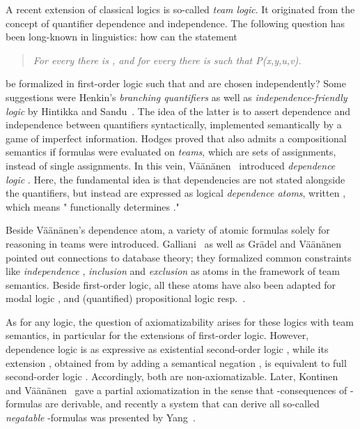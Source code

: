 \documentclass[a4paper,english,fleqn,11pt,final]{scrartcl}
\theoremstyle{plain}
\theoremstyle{definition}
\begin{document}
A recent extension of classical logics is so-called \emph{team logic}.
It originated from the concept of quantifier dependence and independence. The following question has been long-known in linguistics: how can the statement
\begin{quote}
\emph{For every  there is , and for every  there is  such that P(x,y,u,v).}
\end{quote} be formalized in first-order logic such that  and  are chosen independently?
Some suggestions were Henkin's \emph{branching quantifiers} \cite{Henkin1961} as well as \emph{in\-de\-pend\-ence-friendly logic}  by Hintikka and Sandu~\cite{hintikka_informational_1989}.
The idea of the latter is to assert dependence and independence between quantifiers syntactically, implemented semantically by a game of imperfect information.
Hodges \cite{Hodges1997} proved that  also admits a compositional semantics if formulas were evaluated on \emph{teams}, which are sets of assignments, instead of single assignments.
In this vein, Väänänen~\cite{vaananen_dependence_2007} introduced \emph{dependence logic} .
Here, the fundamental idea is that dependencies are not stated alongside the quantifiers, but instead are expressed as logical \emph{dependence atoms}, written , which means " functionally determines ."

\smallskip

Beside Väänänen's dependence atom, a variety of atomic formulas solely for reasoning in teams were introduced. Galliani~\cite{galliani_inclusion_2012} as well as Grädel and Väänänen~\cite{gradel2013dependence} pointed out connections to database theory; they formalized common constraints like \emph{independence} , \emph{inclusion}  and \emph{exclusion}  as atoms in the framework of team semantics.
Beside first-order logic, all these atoms have also been adapted for modal logic  \cite{vaananen_modal_2008}, and (quantified) propositional logic  resp.\  \cite{sano_et_al,yang_propositional_2016,gandalf}.

\smallskip

As for any logic, the question of axiomatizability arises for these logics with team semantics, in particular for the extensions of first-order logic.
However, dependence logic  is as expressive as existential second-order logic  \cite{vaananen_dependence_2007}, while its extension , obtained from  by adding a semantical negation , is equivalent to full second-order logic  \cite{hutchison_team_2009}.
Accordingly, both are non-axiomatizable.
Later, Kontinen and Väänänen~\cite{kontinen_axiomatizing_2013} gave a partial axiomatization in the sense that -consequences of -formulas are derivable, and recently a system that can derive all so-called \emph{negatable} -formulas was presented by Yang~\cite{Yang2016}.
\end{document}
